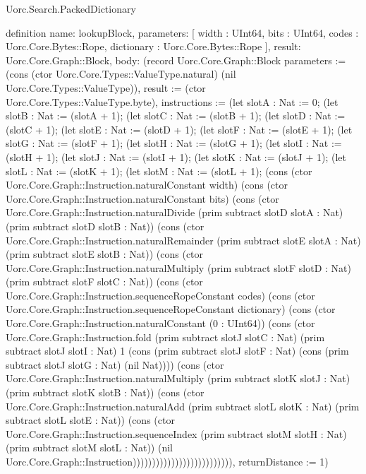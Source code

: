 \begin{lexlean}{Uorc.Search.PackedDictionary}
\begin{semanticmodule}
definition{
  name: lookupBlock,
  parameters: [
    width : UInt64,
    bits : UInt64,
    codes : Uorc.Core.Bytes::Rope,
    dictionary : Uorc.Core.Bytes::Rope
  ],
  result: Uorc.Core.Graph::Block,
  body: (record Uorc.Core.Graph::Block {parameters := (cons (ctor Uorc.Core.Types::ValueType.natural) (nil Uorc.Core.Types::ValueType)), result := (ctor Uorc.Core.Types::ValueType.byte), instructions := (let slotA : Nat := 0; (let slotB : Nat := (slotA + 1); (let slotC : Nat := (slotB + 1); (let slotD : Nat := (slotC + 1); (let slotE : Nat := (slotD + 1); (let slotF : Nat := (slotE + 1); (let slotG : Nat := (slotF + 1); (let slotH : Nat := (slotG + 1); (let slotI : Nat := (slotH + 1); (let slotJ : Nat := (slotI + 1); (let slotK : Nat := (slotJ + 1); (let slotL : Nat := (slotK + 1); (let slotM : Nat := (slotL + 1); (cons (ctor Uorc.Core.Graph::Instruction.naturalConstant width) (cons (ctor Uorc.Core.Graph::Instruction.naturalConstant bits) (cons (ctor Uorc.Core.Graph::Instruction.naturalDivide (prim subtract slotD slotA : Nat) (prim subtract slotD slotB : Nat)) (cons (ctor Uorc.Core.Graph::Instruction.naturalRemainder (prim subtract slotE slotA : Nat) (prim subtract slotE slotB : Nat)) (cons (ctor Uorc.Core.Graph::Instruction.naturalMultiply (prim subtract slotF slotD : Nat) (prim subtract slotF slotC : Nat)) (cons (ctor Uorc.Core.Graph::Instruction.sequenceRopeConstant codes) (cons (ctor Uorc.Core.Graph::Instruction.sequenceRopeConstant dictionary) (cons (ctor Uorc.Core.Graph::Instruction.naturalConstant (0 : UInt64)) (cons (ctor Uorc.Core.Graph::Instruction.fold (prim subtract slotJ slotC : Nat) (prim subtract slotJ slotI : Nat) 1 (cons (prim subtract slotJ slotF : Nat) (cons (prim subtract slotJ slotG : Nat) (nil Nat)))) (cons (ctor Uorc.Core.Graph::Instruction.naturalMultiply (prim subtract slotK slotJ : Nat) (prim subtract slotK slotB : Nat)) (cons (ctor Uorc.Core.Graph::Instruction.naturalAdd (prim subtract slotL slotK : Nat) (prim subtract slotL slotE : Nat)) (cons (ctor Uorc.Core.Graph::Instruction.sequenceIndex (prim subtract slotM slotH : Nat) (prim subtract slotM slotL : Nat)) (nil Uorc.Core.Graph::Instruction)))))))))))))))))))))))))), returnDistance := 1})
}


\end{semanticmodule}
\end{lexlean}
